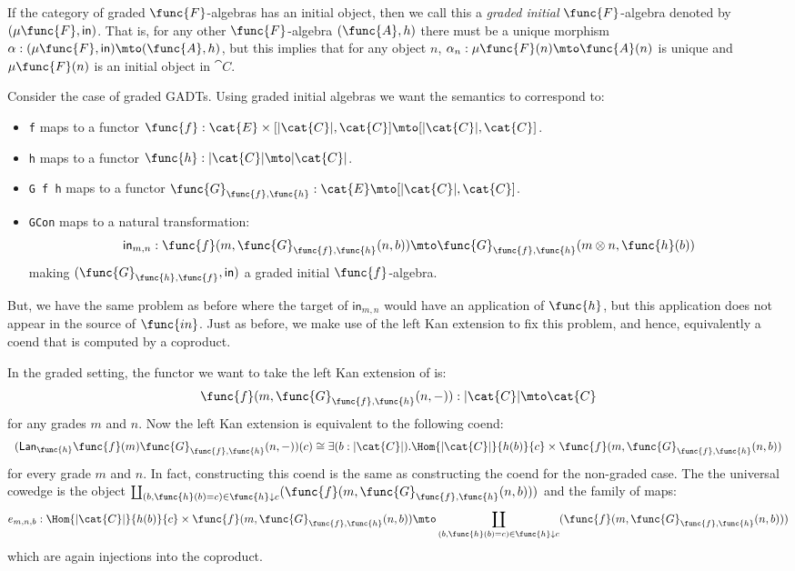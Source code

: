 \begin{definition}
    If the category of graded $\func{F}$-algebras has an initial object, then
    we call this a \emph{graded initial} $\func{F}$-algebra denoted
    by $(\mu\func{F}, \mathsf{in})$.  That is, for any other
    $\func{F}$-algebra $(\func{A},h)$ there must be a unique morphism 
    $\alpha : (\mu\func{F}, \mathsf{in}) \mto (\func{A},h)$, but this
    implies that for any object $n$, $\alpha_n : \mu\func{F}(n) \mto
    \func{A}(n)$ is unique and $\mu\func{F}(n)$ is an initial object
    in $\cat{C}$.
\end{definition}

Consider the case of graded GADTs. Using graded initial algebras we
want the semantics to correspond to:
\begin{itemize}
    \item \verb!f! maps to a functor 
    $\func{f} : \cat{E} \times [|\cat{C}|,\cat{C}] \mto [|\cat{C}|, \cat{C}]$.

    \item \verb!h! maps to a functor 
    $\func{h} : |\cat{C}| \mto |\cat{C}|$. 

    \item \verb!G f h! maps to a functor 
          $\func{G}_{\func{f},\func{h}} : \cat{E} \mto [|\cat{C}|,\cat{C}]$.

    \item \verb!GCon! maps to a natural transformation:
          \[
            \mathsf{in}_{m,n} : \func{f}(m,\func{G}_{\func{f},\func{h}}(n,b)) \mto \func{G}_{\func{f},\func{h}}(m \otimes n,\func{h}(b))
          \]
          making $(\func{G}_{\func{h},\func{f}},\mathsf{in})$ a graded
          initial $\func{f}$-algebra.
\end{itemize}
\noindent But, we have the same problem as before where the target of
$\mathsf{in}_{m,n}$ would have an application of $\func{h}$, but this
application does not appear in the source of $\func{in}$.  Just as
before, we make use of the left Kan extension to fix this problem, and
hence, equivalently a coend that is computed by a coproduct.

In the graded setting, the functor we want to take the left Kan
extension of is:
\[
    \func{f}(m,\func{G}_{\func{f},\func{h}}(n,-)) : |\cat{C}| \mto \cat{C}
\]
for any grades $m$ and $n$. Now the left Kan extension is equivalent to the following coend:
\[
\begin{array}{lll}
    (\Lan{\func{h}}{\func{f}(m)\func{G}_{\func{f},\func{h}}(n,-)})(c) 
    \cong 
    \exists(b : |\cat{C}|).\Hom{|\cat{C}|}{h(b)}{c} \times \func{f}(m,\func{G}_{\func{f},\func{h}}(n,b))
\end{array}
\]
for every grade $m$ and $n$.  In fact, constructing this coend is the
same as constructing the coend for the non-graded case. 
The the universal cowedge is the object $\coprod_{(b,\func{h}(b) = c)
\in \func{h} \downarrow c}(\func{f}(m,\func{G}_{\func{f},\func{h}}(n,b)))$
and the family of maps:
\[
    e_{m,n,b} : \Hom{|\cat{C}|}{h(b)}{c} \times \func{f}(m,\func{G}_{\func{f},\func{h}}(n,b)) \mto 
    \coprod_{(b,\func{h}(b) = c) \in \func{h} \downarrow c}(\func{f}(m,\func{G}_{\func{f},\func{h}}(n,b)))
\]
which are again injections into the coproduct.  

